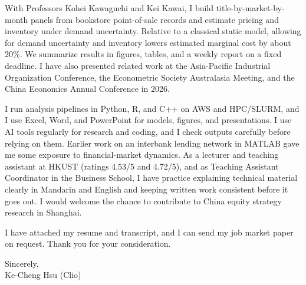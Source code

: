 \documentclass[11pt,letterpaper]{article}
\begin{document}
With Professors Kohei Kawaguchi and Kei Kawai, I build title-by-market-by-month panels from bookstore point-of-sale records and estimate pricing and inventory under demand uncertainty. Relative to a classical static model, allowing for demand uncertainty and inventory lowers estimated marginal cost by about 20\%. We summarize results in figures, tables, and a weekly report on a fixed deadline. I have also presented related work at the Asia-Pacific Industrial Organization Conference, the Econometric Society Australasia Meeting, and the China Economics Annual Conference in 2026.

I run analysis pipelines in Python, R, and C++ on AWS and HPC/SLURM, and I use Excel, Word, and PowerPoint for models, figures, and presentations. I use AI tools regularly for research and coding, and I check outputs carefully before relying on them. Earlier work on an interbank lending network in MATLAB gave me some exposure to financial-market dynamics. As a lecturer and teaching assistant at HKUST (ratings 4.53/5 and 4.72/5), and as Teaching Assistant Coordinator in the Business School, I have practice explaining technical material clearly in Mandarin and English and keeping written work consistent before it goes out. I would welcome the chance to contribute to China equity strategy research in Shanghai.

I have attached my resume and transcript, and I can send my job market paper on request. Thank you for your consideration.

\vspace{0.5em}
Sincerely,\\[0.4em]
Ke-Cheng Hsu (Clio)
\end{document}

